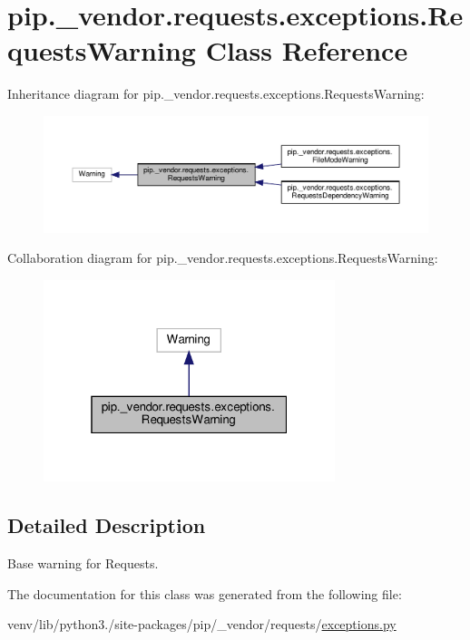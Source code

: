 \hypertarget{classpip_1_1__vendor_1_1requests_1_1exceptions_1_1RequestsWarning}{}\section{pip.\+\_\+vendor.\+requests.\+exceptions.\+Requests\+Warning Class Reference}
\label{classpip_1_1__vendor_1_1requests_1_1exceptions_1_1RequestsWarning}


Inheritance diagram for pip.\+\_\+vendor.\+requests.\+exceptions.\+Requests\+Warning\+:
\nopagebreak
\begin{figure}[H]
\begin{center}
\leavevmode
\includegraphics[width=350pt]{classpip_1_1__vendor_1_1requests_1_1exceptions_1_1RequestsWarning__inherit__graph}
\end{center}
\end{figure}


Collaboration diagram for pip.\+\_\+vendor.\+requests.\+exceptions.\+Requests\+Warning\+:
\nopagebreak
\begin{figure}[H]
\begin{center}
\leavevmode
\includegraphics[width=241pt]{classpip_1_1__vendor_1_1requests_1_1exceptions_1_1RequestsWarning__coll__graph}
\end{center}
\end{figure}


\subsection{Detailed Description}
\begin{DoxyVerb}Base warning for Requests.\end{DoxyVerb}
 

The documentation for this class was generated from the following file\+:\begin{DoxyCompactItemize}
\item 
venv/lib/python3./site-\/packages/pip/\+\_\+vendor/requests/\hyperlink{pip_2__vendor_2requests_2exceptions_8py}{exceptions.\+py}\end{DoxyCompactItemize}
